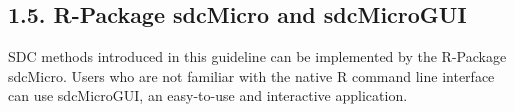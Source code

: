 \documentclass[]{article}
\begin{document}
\newpage
\subsection*{1.5. R-Package sdcMicro and sdcMicroGUI}
SDC methods introduced in this guideline can be implemented by the R-Package
sdcMicro. Users who are not familiar with the native R command line interface
can use sdcMicroGUI, an easy-to-use and interactive application. 
\end{document}
